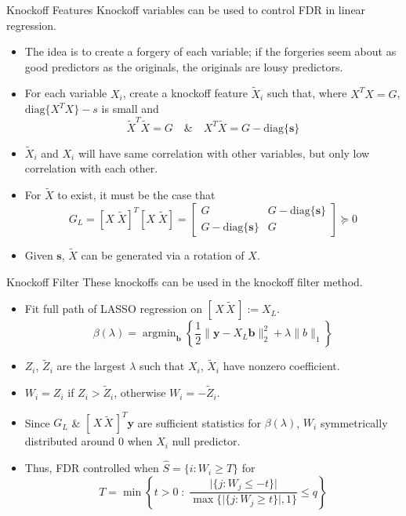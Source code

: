 \documentclass{beamer}
\newcommand{\diag}[1]{\mathrm{diag}\{#1\}}
\DeclareMathOperator*{\argmin}{arg\min}
\begin{document}
\begin{frame}{Knockoff Features}
    Knockoff variables can be used to control FDR in linear regression. 
    \begin{itemize}
        \item The idea is to create a forgery of each variable; if the forgeries seem about as good predictors as the originals, the originals are lousy predictors.
        \item For each variable $X_i$, create a knockoff feature $\tilde X_i$ such that, where $X^TX=G$, $\diag{X^T X} - s$ is small and 
            \[ \tilde X^T \tilde X = G \quad \& \quad X^T \tilde X = G - \diag{\mathbf s} \]
        \item $\tilde X_i$ and $X_i$ will have same correlation with other variables, but only low correlation with each other.
        \item For $\tilde X$ to exist, it must be the case that
            \[ G_L =[X\; \tilde X]^T[X\; \tilde X] = \left[ \begin{array}{cc} G & G - \diag{\mathbf s} \\ G - \diag{\mathbf s} & G \end{array}\right] \succeq 0 \]
        \item Given $\mathbf s$, $\tilde X$ can be generated via a rotation of $X$.
    \end{itemize}
\end{frame}

\begin{frame}{Knockoff Filter}
    These knockoffs can be used in the knockoff filter method. 
    \begin{itemize}
        \item Fit full path of LASSO regression on $[\,X\,\tilde X\,]:=X_L$.
    \[ \beta(\lambda) = \argmin_\mathbf b \left\{\frac{1}{2}\|\mathbf y - X_L\mathbf b\|^2_2 + \lambda\|b\|_1 \right\}\]
        \item $Z_i$, $\tilde Z_i$ are the largest $\lambda$ such that $X_i$, $\tilde X_i$ have nonzero coefficient.
        \item $W_i= Z_i$ if $Z_i>\tilde Z_i$, otherwise $W_i = -\tilde Z_i$.
        \item Since $G_L$ \& $[\, X \, \tilde X\,]^T\mathbf y$ are sufficient statistics for $\beta(\lambda)$, $W_i$ symmetrically distributed around $0$ when $X_i$ null predictor.
        \item Thus, FDR controlled when $\hat S = \{i:W_i\geq T\}$ for 
            \[ T = \min\left\{ t>0 \;: \; \frac{\vert\{j:W_j\leq -t\}\vert}{\max\{\vert\{j:W_j\geq t\}\vert,1\}}\leq q \right\} \]
    \end{itemize}
\end{frame}
\end{document}
